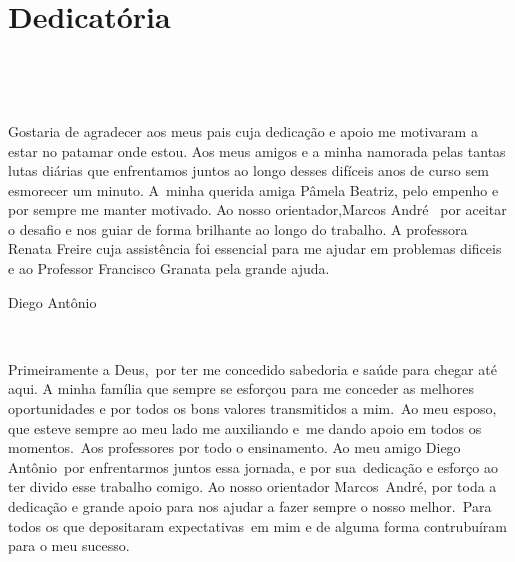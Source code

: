 \documentclass[
    12pt,               %
    openright,          %
    oneside,            %
    a4paper,            %
    section=TITLE,     %
    english,            %
    french,             %
    spanish,            %
    brazil              %
    ]{abntex2}
\begin{document}
\begin{dedicatoria}
   \vspace*{\fill}
   \centering
   \noindent
   \itshape 
\begin{flushright}
~
\end{flushright}



\chapter*{Dedicatória}


\begin{flushright}
~
\end{flushright}



\begin{flushright}
~
\end{flushright}



\begin{flushright}
Gostaria de agradecer aos meus pais cuja dedicação e apoio me motivaram a estar no patamar onde estou. Aos meus amigos e a minha namorada pelas tantas lutas diárias que enfrentamos juntos ao longo desses difíceis anos de curso sem esmorecer um minuto. A~minha querida amiga Pâmela Beatriz, pelo empenho e por sempre me manter motivado. Ao nosso orientador,Marcos André~ por aceitar o desafio e nos guiar de forma brilhante ao longo do trabalho. A professora Renata Freire cuja assistência foi essencial para me ajudar em problemas dificeis e ao Professor Francisco Granata pela grande ajuda.
\end{flushright}





\begin{flushright}
Diego Antônio
\end{flushright}



\begin{flushright}
~
\end{flushright}



\begin{flushright}
Primeiramente a Deus,~por ter me concedido sabedoria e saúde para chegar até aqui. A minha família que sempre se esforçou para me conceder as melhores oportunidades e por todos os bons valores transmitidos a mim.~Ao meu esposo, que esteve sempre ao meu lado me auxiliando e~me dando apoio em todos os momentos.~Aos professores por todo o ensinamento. Ao meu amigo Diego Antônio~por enfrentarmos juntos essa jornada, e por sua~dedicação e esforço ao ter divido esse trabalho comigo. Ao nosso orientador Marcos~André, por toda a dedicação e grande apoio para nos ajudar a fazer sempre o nosso melhor.~Para todos os que depositaram expectativas~em mim e de alguma forma contrubuíram para o meu sucesso.
\end{flushright}




\end{dedicatoria}
\end{document}
